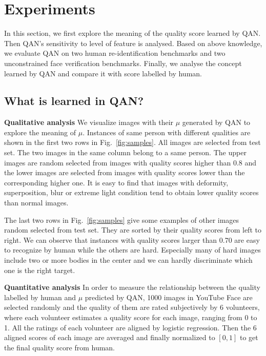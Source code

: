 

\section{Experiments}
\label{others}
In this section, we first explore the meaning of the quality score learned by QAN. Then QAN's sensitivity to level of feature is analysed. Based on above knowledge, we evaluate QAN on two human re-identification benchmarks and two unconstrained face verification benchmarks. Finally, we analyse the concept learned by QAN and compare it with score labelled by human.



\subsection{What is learned in QAN?}


\textbf{Qualitative analysis} 
We visualize images with their $\mu$ generated by QAN to explore the meaning of $\mu$. Instances of same person with different qualities are shown in the first two rows in Fig.~\ref{fig:samples}. All images are selected from test set. The two images in the same column belong to a same person. The upper images are random selected from images with quality scores higher than 0.8 and the lower images are selected from images with quality scores lower than the corresponding higher one. It is easy to find that images with deformity, superposition, blur or extreme light condition tend to obtain lower quality scores than normal images.

The last two rows in Fig.~\ref{fig:samples} give some examples of other images random selected from test set. They are sorted by their quality scores from left to right. We can observe that instances with quality scores larger than 0.70 are easy to recognize by human while the others are hard. Especially many of hard images include two or more bodies in the center and we can hardly discriminate which one is the right target. 

\textbf{Quantitative analysis} 
In order to measure the relationship between the quality labelled by human and $\mu$ predicted by QAN, 1000 images in YouTube Face are selected randomly and the quality of them are rated subjectively by 6 volunteers, where each volunteer estimates a quality score for each image, ranging from 0 to 1. All the ratings of each volunteer are aligned by logistic regression. Then the 6 aligned scores of each image are averaged and finally normalized to $[0,1]$ to get the final quality score from human. %


